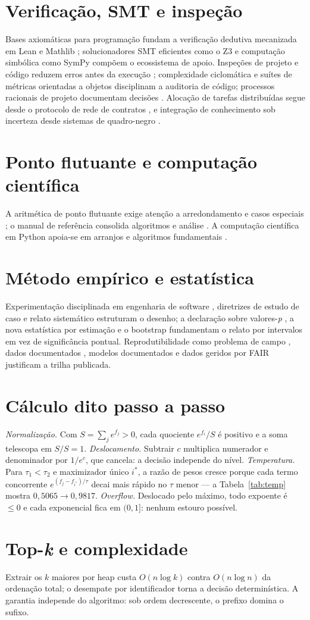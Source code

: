 \section{Verificação, SMT e inspeção}
Bases axiomáticas para programação \cite{hoare1969} fundam a verificação dedutiva mecanizada em Lean \cite{moura2021} e Mathlib \cite{mathlib2020}; solucionadores SMT eficientes como o Z3 \cite{demoura2008} e computação simbólica como SymPy \cite{meurer2017} compõem o ecossistema de apoio. Inspeções de projeto e código reduzem erros antes da execução \cite{fagan1976}; complexidade ciclomática \cite{mccabe1976} e suítes de métricas orientadas a objetos \cite{chidamber1994} disciplinam a auditoria de código; processos racionais de projeto documentam decisões \cite{parnas1986}. Alocação de tarefas distribuídas segue desde o protocolo de rede de contratos \cite{smith1980}, e integração de conhecimento sob incerteza desde sistemas de quadro-negro \cite{erman1980}.
\section{Ponto flutuante e computação científica}
A aritmética de ponto flutuante exige atenção a arredondamento e casos especiais \cite{goldberg1991}; o manual de referência consolida algoritmos e análise \cite{muller2018}. A computação científica em Python apoia-se em arranjos \cite{harris2020} e algoritmos fundamentais \cite{virtanen2020}.
\section{Método empírico e estatística}
Experimentação disciplinada em engenharia de software \cite{basili1986,wohlin2012}, diretrizes de estudo de caso \cite{runeson2009} e relato sistemático \cite{page2021} estruturam o desenho; a declaração sobre valores-\textit{p} \cite{wasserstein2016}, a nova estatística por estimação \cite{cumming2014} e o bootstrap \cite{efron1979} fundamentam o relato por intervalos em vez de significância pontual. Reprodutibilidade como problema de campo \cite{osc2015,collberg2016,ioannidis2005}, dados documentados \cite{gebru2021}, modelos documentados \cite{mitchell2019} e dados geridos por FAIR \cite{wilkinson2016} justificam a trilha publicada.
\section{Cálculo dito passo a passo}
\textit{Normalização.} Com $S=\sum_j e^{f_j}>0$, cada quociente $e^{f_i}/S$ é positivo e a soma telescopa em $S/S=1$. \textit{Deslocamento.} Subtrair $c$ multiplica numerador e denominador por $1/e^c$, que cancela: a decisão independe do nível. \textit{Temperatura.} Para $\tau_1<\tau_2$ e maximizador único $i^*$, a razão de pesos cresce porque cada termo concorrente $e^{(f_j-f_{i^*})/\tau}$ decai mais rápido no $\tau$ menor --- a Tabela~\ref{tab:temp} mostra $0{,}5065\to0{,}9817$. \textit{Overflow.} Deslocado pelo máximo, todo expoente é $\leq0$ e cada exponencial fica em $(0,1]$: nenhum estouro possível.
\section{Top-\textit{k} e complexidade}
Extrair os $k$ maiores por heap custa $O(n\log k)$ contra $O(n\log n)$ da ordenação total; o desempate por identificador torna a decisão determinística. A garantia independe do algoritmo: sob ordem decrescente, o prefixo domina o sufixo.

